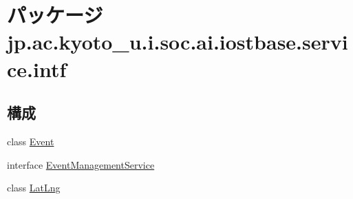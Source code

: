 \hypertarget{namespacejp_1_1ac_1_1kyoto__u_1_1i_1_1soc_1_1ai_1_1iostbase_1_1service_1_1intf}{\section{パッケージ jp.\-ac.\-kyoto\-\_\-u.\-i.\-soc.\-ai.\-iostbase.\-service.\-intf}
\label{namespacejp_1_1ac_1_1kyoto__u_1_1i_1_1soc_1_1ai_1_1iostbase_1_1service_1_1intf}
}
\subsection*{構成}
\begin{DoxyCompactItemize}
\item 
class \hyperlink{classjp_1_1ac_1_1kyoto__u_1_1i_1_1soc_1_1ai_1_1iostbase_1_1service_1_1intf_1_1_event}{Event}
\item 
interface \hyperlink{interfacejp_1_1ac_1_1kyoto__u_1_1i_1_1soc_1_1ai_1_1iostbase_1_1service_1_1intf_1_1_event_management_service}{Event\-Management\-Service}
\item 
class \hyperlink{classjp_1_1ac_1_1kyoto__u_1_1i_1_1soc_1_1ai_1_1iostbase_1_1service_1_1intf_1_1_lat_lng}{Lat\-Lng}
\end{DoxyCompactItemize}

